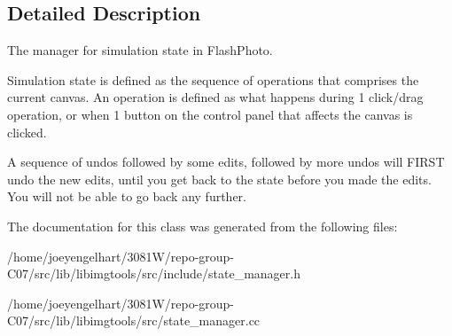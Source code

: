 \subsection{Detailed Description}
The manager for simulation state in Flash\+Photo. 

Simulation state is defined as the sequence of operations that comprises the current canvas. An operation is defined as what happens during 1 click/drag operation, or when 1 button on the control panel that affects the canvas is clicked.

A sequence of undos followed by some edits, followed by more undos will F\+I\+R\+ST undo the new edits, until you get back to the state before you made the edits. You will not be able to go back any further. 

The documentation for this class was generated from the following files\+:\begin{DoxyCompactItemize}
\item 
/home/joeyengelhart/3081\+W/repo-\/group-\/\+C07/src/lib/libimgtools/src/include/state\+\_\+manager.\+h\item 
/home/joeyengelhart/3081\+W/repo-\/group-\/\+C07/src/lib/libimgtools/src/state\+\_\+manager.\+cc\end{DoxyCompactItemize}
